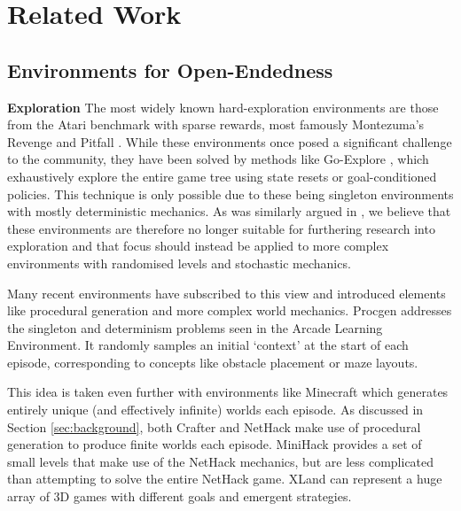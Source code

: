 \documentclass{article}
\theoremstyle{plain}
\theoremstyle{definition}
\theoremstyle{remark}
\begin{document}

\section{Related Work}

\subsection{Environments for Open-Endedness}

\textbf{Exploration} The most widely known hard-exploration environments are those from the Atari benchmark with sparse rewards, most famously Montezuma's Revenge and Pitfall \citep{bellemare2013arcade}.  While these environments once posed a significant challenge to the community, they have been solved by methods like Go-Explore \citep{ecoffet2021first}, which exhaustively explore the entire game tree using state resets or goal-conditioned policies.  This technique is only possible due to these being singleton environments with mostly deterministic mechanics.  As was similarly argued in \citet{nle2020kuttler}, we believe that these environments are therefore no longer suitable for furthering research into exploration and that focus should instead be applied to more complex environments with randomised levels and stochastic mechanics.

Many recent environments have subscribed to this view and introduced elements like procedural generation and more complex world mechanics.  Procgen \citep{cobbe2020leveraging} addresses the singleton and determinism problems seen in the Arcade Learning Environment.  It randomly samples an initial `context' at the start of each episode, corresponding to concepts like obstacle placement or maze layouts.

This idea is taken even further with environments like Minecraft \citep{johnson2016malmo} which generates entirely unique (and effectively infinite) worlds each episode.  As discussed in Section \ref{sec:background}, both Crafter \citep{hafner2021benchmarking} and NetHack \citep{nle2020kuttler} make use of procedural generation to produce finite worlds each episode.  MiniHack \citep{minihack2021samvelyan} provides a set of small levels that make use of the NetHack mechanics, but are less complicated than attempting to solve the entire NetHack game.
XLand \citep{open2021oelteam} can represent a huge array of 3D games with different goals and emergent strategies.
\end{document}

